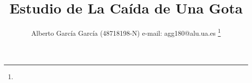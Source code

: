 \documentclass[journal]{IEEEtran}
\begin{document}
%
\title{Estudio de La Caída de Una Gota}
%
%
%

\author{Alberto García García (48718198-N) e-mail: agg180@alu.ua.es %
\thanks{}%
}

% 
%



%
{}
% 
\end{document}
